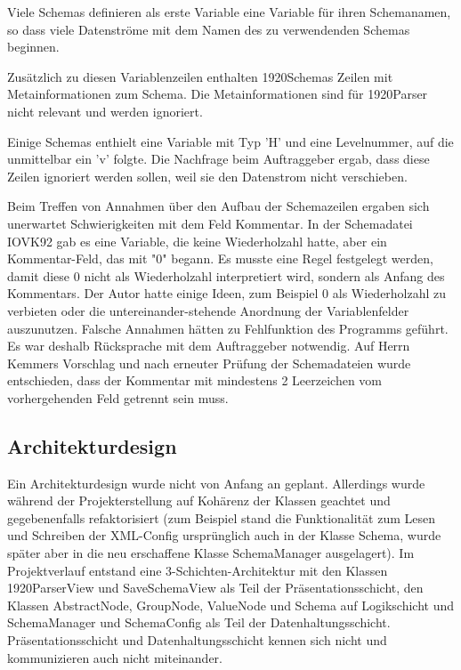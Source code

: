 Viele Schemas definieren als erste Variable eine Variable für ihren Schemanamen, so dass viele Datenströme mit dem Namen des zu verwendenden Schemas beginnen.

Zusätzlich zu diesen Variablenzeilen enthalten 1920Schemas Zeilen mit Metainformationen zum Schema. Die Metainformationen sind für 1920Parser nicht relevant und werden ignoriert.

Einige Schemas enthielt eine Variable mit Typ 'H' und eine Levelnummer, auf die unmittelbar ein 'v' folgte. Die Nachfrage beim Auftraggeber ergab, dass diese Zeilen ignoriert werden sollen, weil sie den Datenstrom nicht verschieben.

Beim Treffen von Annahmen über den Aufbau der Schemazeilen ergaben sich unerwartet Schwierigkeiten mit dem Feld Kommentar. In der Schemadatei IOVK92 gab es eine Variable, die keine Wiederholzahl hatte, aber ein Kommentar-Feld, das mit "0" begann. Es musste eine Regel festgelegt werden, damit diese 0 nicht als Wiederholzahl interpretiert wird, sondern als Anfang des Kommentars. Der Autor hatte einige Ideen, zum Beispiel 0 als Wiederholzahl zu verbieten oder die untereinander-stehende Anordnung der Variablenfelder auszunutzen. Falsche Annahmen hätten zu Fehlfunktion des Programms geführt. Es war deshalb Rücksprache mit dem Auftraggeber notwendig. Auf Herrn Kemmers Vorschlag und nach erneuter Prüfung der Schemadateien wurde entschieden, dass der Kommentar mit mindestens 2 Leerzeichen vom vorhergehenden Feld getrennt sein muss.

\subsection{Architekturdesign}
\label{sec:Architekturdesign}
Ein Architekturdesign wurde nicht von Anfang an geplant. Allerdings wurde während der Projekterstellung auf Kohärenz der Klassen geachtet und gegebenenfalls refaktorisiert (zum Beispiel stand die Funktionalität zum Lesen und Schreiben der XML-Config ursprünglich auch in der Klasse Schema, wurde später aber in die neu erschaffene Klasse SchemaManager ausgelagert). Im Projektverlauf entstand eine 3-Schichten-Architektur mit den Klassen 1920ParserView und SaveSchemaView als Teil der Präsentationsschicht, den Klassen AbstractNode, GroupNode, ValueNode und Schema auf Logikschicht und SchemaManager und SchemaConfig als Teil der Datenhaltungsschicht. Präsentationsschicht und Datenhaltungsschicht kennen sich nicht und kommunizieren auch nicht miteinander.

